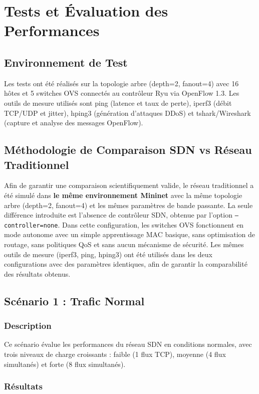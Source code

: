 \documentclass[12pt,a4paper]{report}
\begin{document}
\chapter{Tests et Évaluation des Performances}

\section{Environnement de Test}
Les tests ont été réalisés sur la topologie arbre
(depth=2, fanout=4) avec 16 hôtes et 5 switches OVS
connectés au contrôleur Ryu via OpenFlow 1.3. Les outils
de mesure utilisés sont ping (latence et taux de perte),
iperf3 (débit TCP/UDP et jitter), hping3 (génération
d'attaques DDoS) et tshark/Wireshark (capture et analyse
des messages OpenFlow).

\section{Méthodologie de Comparaison SDN vs Réseau Traditionnel}
Afin de garantir une comparaison scientifiquement valide,
le réseau traditionnel a été simulé dans \textbf{le même
environnement Mininet} avec la même topologie arbre
(depth=2, fanout=4) et les mêmes paramètres de bande
passante. La seule différence introduite est l'absence
de contrôleur SDN, obtenue par l'option
\texttt{--controller=none}. Dans cette configuration,
les switches OVS fonctionnent en mode autonome avec
un simple apprentissage MAC basique, sans optimisation
de routage, sans politiques QoS et sans aucun mécanisme
de sécurité. Les mêmes outils de mesure (iperf3, ping,
hping3) ont été utilisés dans les deux configurations
avec des paramètres identiques, afin de garantir la
comparabilité des résultats obtenus.

\section{Scénario 1 : Trafic Normal}

\subsection{Description}
Ce scénario évalue les performances du réseau SDN en
conditions normales, avec trois niveaux de charge
croissants : faible (1 flux TCP), moyenne (4 flux
simultanés) et forte (8 flux simultanés).

\subsection{Résultats}
\end{document}
